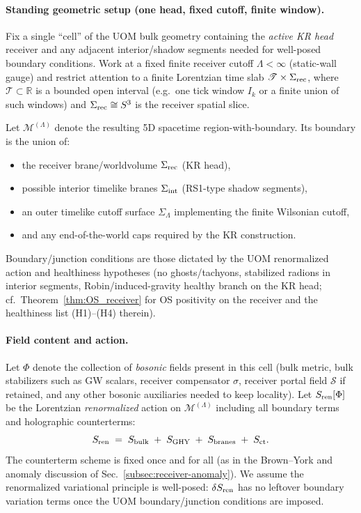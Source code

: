 \documentclass[10pt]{article}
\theoremstyle{definition}
\theoremstyle{plain}
\begin{document}
\paragraph{Standing geometric setup (one head, fixed cutoff, finite window).}
Fix a single ``cell'' of the UOM bulk geometry containing the \emph{active KR head} receiver
and any adjacent interior/shadow segments needed for well-posed boundary conditions.
Work at a fixed finite receiver cutoff $\Lambda<\infty$ (static-wall gauge) and restrict
attention to a finite Lorentzian time slab $\mathscr T\times\Sigma_{\rm rec}$, where
$\mathscr T\subset\mathbb R$ is a bounded open interval (e.g.\ one tick window $I_k$ or a finite union of
such windows) and $\Sigma_{\rm rec}\cong S^3$ is the receiver spatial slice.

Let $\mathcal M^{(\Lambda)}$ denote the resulting 5D spacetime region-with-boundary. Its boundary is the union of:
\begin{itemize}[leftmargin=1.6em,itemsep=2pt]
\item the receiver brane/worldvolume $\Sigma_{\rm rec}$ (KR head),
\item possible interior timelike branes $\Sigma_{\rm int}$ (RS1-type shadow segments),
\item an outer timelike cutoff surface $\Sigma_{\Lambda}$ implementing the finite Wilsonian cutoff,
\item and any end-of-the-world caps required by the KR construction.
\end{itemize}
Boundary/junction conditions are those dictated by the UOM renormalized action and
healthiness hypotheses (no ghosts/tachyons, stabilized radions in interior segments, Robin/induced-gravity
healthy branch on the KR head; cf.\ Theorem~\ref{thm:OS_receiver} for OS positivity on the receiver and the
healthiness list (H1)--(H4) therein).

\paragraph{Field content and action.}
Let $\Phi$ denote the collection of \emph{bosonic} fields present in this cell (bulk metric, bulk stabilizers
such as GW scalars, receiver compensator $\sigma$, receiver portal field $\mathcal S$ if retained, and any
other bosonic auxiliaries needed to keep locality).  Let $S_{\rm ren}[\Phi]$ be the Lorentzian
\emph{renormalized} action on $\mathcal M^{(\Lambda)}$ including all boundary terms and holographic counterterms:
\[
S_{\rm ren} \;=\; S_{\rm bulk} \; + \; S_{\rm GHY} \; + \; S_{\rm branes} \; + \; S_{\rm ct}.
\]
The counterterm scheme is fixed once and for all (as in the Brown--York and anomaly discussion of
Sec.~\ref{subsec:receiver-anomaly}).  We assume the renormalized variational principle is well-posed:
$\delta S_{\rm ren}$ has no leftover boundary variation terms once the UOM boundary/junction conditions are imposed.
\end{document}
